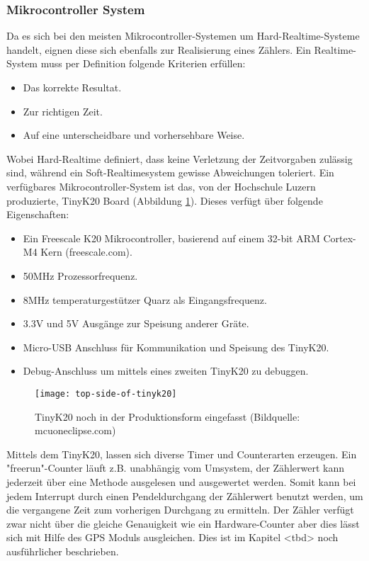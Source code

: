 	\subsubsection{Mikrocontroller System}
   		Da es sich bei den meisten Mikrocontroller-Systemen um Hard-Realtime-Systeme handelt, eignen diese sich ebenfalls zur Realisierung eines Zählers. Ein Realtime-System muss per Definition folgende Kriterien erfüllen:
   		\begin{itemize}
   			\item Das korrekte Resultat.
   			\item Zur richtigen Zeit.
   			\item Auf eine unterscheidbare und vorhersehbare Weise.
		\end{itemize}
		Wobei Hard-Realtime definiert, dass keine Verletzung der Zeitvorgaben zulässig sind, während ein Soft-Realtimesystem gewisse Abweichungen toleriert. Ein verfügbares Mikrocontroller-System ist das, von der Hochschule Luzern produzierte, TinyK20 Board (Abbildung \ref{fig:TinyK20}). Dieses verfügt über folgende Eigenschaften:
		\begin{itemize}
			\item Ein Freescale K20 Mikrocontroller, basierend auf einem  32-bit ARM Cortex-M4 Kern (freescale.com).
			\item 50MHz Prozessorfrequenz.
			\item 8MHz temperaturgestützer Quarz als Eingangsfrequenz.
			\item 3.3V und 5V Ausgänge zur Speisung anderer Gräte.
			\item Micro-USB Anschluss für Kommunikation und Speisung des TinyK20.
			\item Debug-Anschluss um mittels eines zweiten TinyK20 zu debuggen.
		\end{itemize}
		\begin{figure}[H]
        	\centering
        	\texttt{[image: top-side-of-tinyk20]}
        	\caption{TinyK20 noch in der Produktionsform eingefasst (Bildquelle: mcuoneclipse.com)}
        	\label{fig:TinyK20}
    	\end{figure}
    	Mittels dem TinyK20, lassen sich diverse Timer und Counterarten erzeugen. Ein "freerun"-Counter läuft z.B. unabhängig vom Umsystem, der Zählerwert kann jederzeit über eine Methode ausgelesen und ausgewertet werden. Somit kann bei jedem Interrupt durch einen Pendeldurchgang der Zählerwert benutzt werden, um die vergangene Zeit zum vorherigen Durchgang zu ermitteln. Der Zähler verfügt zwar nicht über die gleiche Genauigkeit wie ein Hardware-Counter aber dies lässt sich mit Hilfe des GPS Moduls ausgleichen. Dies ist im Kapitel <tbd> noch ausführlicher beschrieben.
